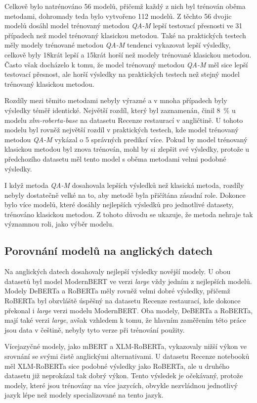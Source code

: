 Celkově bylo natrénováno 56 modelů, přičemž každý z nich byl trénován oběma metodami, dohromady teda bylo vytvořeno 112 modelů. Z těchto 56 dvojic modelů dosáhl model trénovaný metodou \emph{QA-M} lepší testovací přesnosti ve 31 případech než model trénovaný klasickou metodou. Také na praktických testech měly modely trénované metodou \emph{QA-M} tendenci vykazovat lepší výsledky, celkově byly 18krát lepší a 15krát horší než modely trénované klasickou metodou. Často však docházelo k tomu, že model trénovaný metodou \emph{QA-M} měl sice lepší testovací přesnost, ale horší výsledky na praktických testech než stejný model trénovaný klasickou metodou.

Rozdíly mezi těmito metodami nebyly výrazné a v mnoha případech byly výsledky téměř identické. Největší rozdíl, který byl zaznamenán, činil 8~\% u modelu \emph{xlm-roberta-base} na datasetu Recenze restaurací v angličtině. U tohoto modelu byl rovněž největší rozdíl v praktických testech, kde model trénovaný metodou \emph{QA-M} vykázal o 5 správných predikcí více. Pokud by model trénovaný klasickou metodou byl znova trénován, mohl by si zlepšit své výsledky, protože u předchozího datasetu měl tento model s oběma metodami velmi podobné výsledky.

I když metoda \emph{QA-M} dosahovala lepších výsledků než klasická metoda, rozdíly nebyly dostatečně velké na to, aby metodě byla přičítána zásadní role. Dokonce bylo více modelů, které dosáhly nejlepších výsledků pro jednotlivé datasety, trénováno klasickou metodou. Z tohoto důvodu se ukazuje, že metoda nehraje tak významnou roli, jako výběr modelu.

\subsection{Porovnání modelů na anglických datech}  
Na anglických datech dosahovaly nejlepší výsledky novější modely. U obou datasetů byl model ModernBERT ve verzi \emph{large} vždy jedním z nejlepších modelů. Modely DeBERTa a RoBERTa měly rovněž velmi dobré výsledky, přičemž RoBERTa byl obzvláště úspěšný na datasetu Recenze restaurací, kde dokonce překonal i \emph{large} verzi modelu ModernBERT. Oba modely, DeBERTa a RoBERTa, mají také verzi \emph{large}, avšak vzhledem k tomu, že hlavním zaměřením této práce jsou data v češtině, nebyly tyto verze při trénování použity.

Vícejazyčné modely, jako mBERT a XLM-RoBERTa, vykazovaly nižší výkon ve srovnání se svými čistě anglickými alternativami. U datasetu Recenze notebooků měl XLM-RoBERTa sice podobné výsledky jako RoBERTa, ale u druhého datasetu již neprokázal tak dobrý výkon. Tento výsledek je očekávaný, protože modely, které jsou trénovány na více jazycích, obvykle nezvládnou jednotlivý jazyk lépe než modely specializované na tento jazyk.

